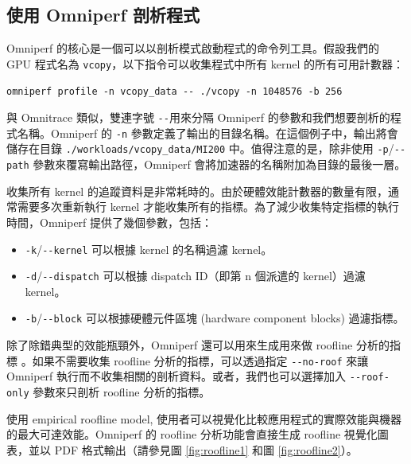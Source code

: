 \subsection{使用 Omniperf 剖析程式}
Omniperf 的核心是一個可以以剖析模式啟動程式的命令列工具。假設我們的 GPU 程式名為 \lstinline|vcopy|，以下指令可以收集程式中所有 kernel 的所有可用計數器：

\lstinline|omniperf profile -n vcopy_data -- ./vcopy -n 1048576 -b 256|

與 Omnitrace 類似，雙連字號 \lstinline|--|用來分隔 Omniperf 的參數和我們想要剖析的程式名稱。Omniperf 的 \lstinline|-n| 參數定義了輸出的目錄名稱。在這個例子中，輸出將會儲存在目錄 \lstinline|./workloads/vcopy_data/MI200| 中。值得注意的是，除非使用 \lstinline|-p|/\lstinline|--path| 參數來覆寫輸出路徑，Omniperf 會將加速器的名稱附加為目錄的最後一層。

收集所有 kernel 的追蹤資料是非常耗時的。由於硬體效能計數器的數量有限，通常需要多次重新執行 kernel 才能收集所有的指標。為了減少收集特定指標的執行時間，Omniperf 提供了幾個參數，包括：

\begin{itemize}
\item \lstinline|-k|/\lstinline|--kernel| 可以根據 kernel 的名稱過濾 kernel。
\item \lstinline|-d|/\lstinline|--dispatch| 可以根據 dispatch ID（即第 n 個派遣的 kernel）過濾 kernel。
\item \lstinline|-b|/\lstinline|--block| 可以根據硬體元件區塊 (hardware component blocks) 過濾指標。
\end{itemize}

除了除錯典型的效能瓶頸外，Omniperf 還可以用來生成用來做 roofline 分析的指標 \cite{williams2009roofline}。如果不需要收集 roofline 分析的指標，可以透過指定 \lstinline|--no-roof| 來讓 Omniperf 執行而不收集相關的剖析資料。或者，我們也可以選擇加入 \lstinline|--roof-only| 參數來只剖析 roofline 分析的指標。

使用 empirical roofline model, 使用者可以視覺化比較應用程式的實際效能與機器的最大可達效能。Omniperf 的 roofline 分析功能會直接生成 roofline 視覺化圖表，並以 PDF 格式輸出（請參見圖 \ref{fig:roofline1} 和圖 \ref{fig:roofline2}）。

